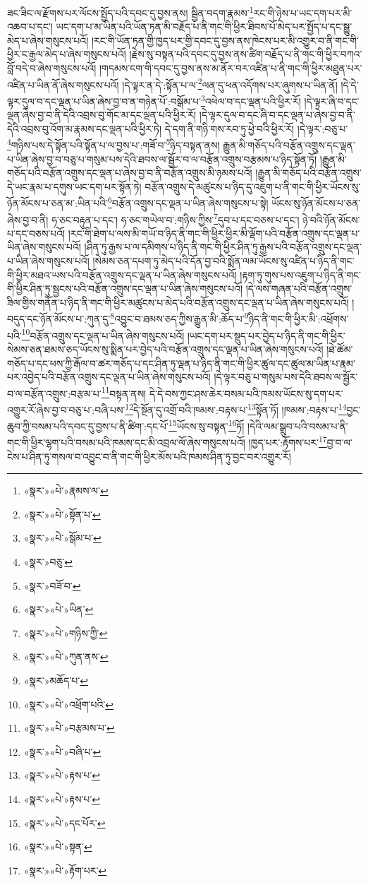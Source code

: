ཟང་ཟིང་ལ་རྫོགས་པར་ལོངས་སྤྱོད་པའི་དབང་དུ་བྱས་ནས། སྦྱིན་བདག་རྣམས་\footnote{«སྣར་»«པེ་»རྣམས་ལ་}རང་གི་ཉེས་པ་ཡང་དག་པར་མི་འཆབ་པ་དང་། ཡང་དག་པ་མ་ཡིན་པའི་ཡོན་ཏན་མི་བརྗོད་པ་ནི་གང་གི་ཕྱིར་ཐིབས་པོ་མེད་པར་སྤྱོད་པ་དང་སྒྱུ་མེད་པ་ཞེས་གསུངས་པའོ། །རང་གི་ཡོན་ཏན་གྱི་ཁྱད་པར་གྱི་དབང་དུ་བྱས་ནས་ཁེངས་པར་མི་འགྱུར་བ་ནི་གང་གི་ཕྱིར་ང་རྒྱལ་མེད་པ་ཞེས་གསུངས་པའོ། །རྗེས་སུ་བསྟན་པའི་དབང་དུ་བྱས་ནས་ཚིག་བརྗོད་པ་ནི་གང་གི་ཕྱིར་བཀའ་བློ་བདེ་བ་ཞེས་གསུངས་པའོ། །གདམས་ངག་གི་དབང་དུ་བྱས་ནས་མ་ནོར་བར་འཛིན་པ་ནི་གང་གི་ཕྱིར་མཐུན་པར་འཛིན་པ་ཡིན་ནོ་ཞེས་གསུངས་པའོ། །དེ་ལྟར་ན་དེ་:སྟོན་པ་ལ་\footnote{«སྣར་»«པེ་»སྟོན་པ་}ལན་དུ་ཕན་འདོགས་པར་ཞུགས་པ་ཡིན་ནོ། །དེ་དེ་ལྟར་དུལ་བ་དང་ལྡན་པ་ཡིན་ཞེས་བྱ་བ་ན་གཉེན་པོ་:བསྒོམ་པ་\footnote{«སྣར་»«པེ་»སྒོམ་པ་}འཕེལ་བ་དང་ལྡན་པའི་ཕྱིར་རོ། །དེ་ལྟར་ཞི་བ་དང་ལྡན་ཞེས་བྱ་བ་ནི་དེའི་འབྲས་བུ་གོང་མ་དང་ལྡན་པའི་ཕྱིར་རོ། །དེ་ལྟར་དུལ་བ་དང་ཞི་བ་དང་ལྡན་པ་ཞེས་བྱ་བ་ནི་དེའི་འབྲས་བུ་འོག་མ་རྣམས་དང་ལྡན་པའི་ཕྱིར་ཏེ། དེ་དག་ནི་གཉི་གས་རབ་ཏུ་ཕྱེ་བའི་ཕྱིར་རོ། །དེ་ལྟར་:བཅུ་པ་\footnote{«སྣར་»བཅུ་}གཉིས་པས་དེ་སྟོན་པའི་སྟོན་པ་ལ་བྱས་པ་:གཟོ་བ་\footnote{«སྣར་»བཟོ་བ་}ཉིད་བསྟན་ནས། རྒྱུན་མི་གཅོད་པའི་བརྩོན་འགྲུས་དང་ལྡན་པ་ཡིན་ཞེས་བྱ་བ་བཅུ་པ་གསུམ་པས་དེའི་ཐབས་ལ་སྦྱོར་བ་ལ་བརྩོན་འགྲུས་བརྩམས་པ་ཉིད་སྟོན་ཏོ། །རྒྱུན་མི་གཅོད་པའི་བརྩོན་འགྲུས་དང་ལྡན་པ་ཞེས་བྱ་བ་ནི་བརྩོན་འགྲུས་མི་ཉམས་པའོ། །རྒྱུན་མི་གཅོད་པའི་བརྩོན་འགྲུས་དེ་ཡང་རྣམ་པ་དགུས་ཡང་དག་པར་སྟོན་ཏེ། བརྩོན་འགྲུས་དེ་མཚུངས་པ་ཉིད་དུ་འཇུག་པ་ནི་གང་གི་ཕྱིར་ཡོངས་སུ་ཉོན་མོངས་པ་ཅན་མ་:ཡིན་པའི་\footnote{«སྣར་»«པེ་»ཡིན་}བརྩོན་འགྲུས་དང་ལྡན་པ་ཡིན་ཞེས་གསུངས་པ་སྟེ། ཡོངས་སུ་ཉོན་མོངས་པ་ཅན་ཞེས་བྱ་བ་ནི། ཧ་ཅང་བརྟུན་པ་དང་། ཧ་ཅང་གཡེལ་བ་:གཉིས་ཀྱིས་\footnote{«སྣར་»«པེ་»གཉིས་ཀྱི་}དུབ་པ་དང་བཅས་པ་དང་། ཉེ་བའི་ཉོན་མོངས་པ་དང་བཅས་པའོ། །རང་གི་ཐེག་པ་ལས་མི་གཡོ་བ་ཉིད་ནི་གང་གི་ཕྱིར་ཕྱིར་མི་ལྡོག་པའི་བརྩོན་འགྲུས་དང་ལྡན་པ་ཡིན་ཞེས་གསུངས་པའོ། །ཤིན་ཏུ་རྒྱས་པ་ལ་དམིགས་པ་ཉིད་ནི་གང་གི་ཕྱིར་ཤིན་ཏུ་རྒྱས་པའི་བརྩོན་འགྲུས་དང་ལྡན་པ་ཡིན་ཞེས་གསུངས་པའོ། །སེམས་ཅན་དཔག་ཏུ་མེད་པའི་དོན་བྱ་བའི་སྨོན་ལམ་ཡོངས་སུ་འཛིན་པ་ཉིད་ནི་གང་གི་ཕྱིར་མཐའ་ཡས་པའི་བརྩོན་འགྲུས་དང་ལྡན་པ་ཡིན་ཞེས་གསུངས་པའོ། །རྟག་ཏུ་གུས་པས་འཇུག་པ་ཉིད་ནི་གང་གི་ཕྱིར་ཤིན་ཏུ་སྦྱངས་པའི་བརྩོན་འགྲུས་དང་ལྡན་པ་ཡིན་ཞེས་གསུངས་པའོ། །དེ་ལས་གཞན་པའི་བརྩོན་འགྲུས་ཟིལ་གྱིས་གནོན་པ་ཉིད་ནི་གང་གི་ཕྱིར་མཚུངས་པ་མེད་པའི་བརྩོན་འགྲུས་དང་ལྡན་པ་ཡིན་ཞེས་གསུངས་པའོ། །བདུད་དང་ཉོན་མོངས་པ་:ཀུན་དུ་\footnote{«སྣར་»«པེ་»ཀུན་ནས་}འབྱུང་བ་ཐམས་ཅད་ཀྱིས་རྒྱུན་མི་:ཆོད་པ་\footnote{«སྣར་»མཆོད་པ་}ཉིད་ནི་གང་གི་ཕྱིར་མི་:འཕྲོགས་པའི་\footnote{«སྣར་»«པེ་»འཕྲོག་པའི་}བརྩོན་འགྲུས་དང་ལྡན་པ་ཡིན་ཞེས་གསུངས་པའོ། །ཡང་དག་པར་སྡུད་པར་བྱེད་པ་ཉིད་ནི་གང་གི་ཕྱིར་སེམས་ཅན་ཐམས་ཅད་ཡོངས་སུ་སྨིན་པར་བྱེད་པའི་བརྩོན་འགྲུས་དང་ལྡན་པ་ཡིན་ཞེས་གསུངས་པའོ། །ཐེ་ཚོམ་གཅོད་པ་དང་ཕས་ཀྱི་རྒོལ་བ་ཚར་གཅོད་པ་དང་ཤིན་ཏུ་ལྡན་པ་ཉིད་ནི་གང་གི་ཕྱིར་ཚུལ་དང་ཚུལ་མ་ཡིན་པ་རྣམ་པར་འབྱེད་པའི་བརྩོན་འགྲུས་དང་ལྡན་པ་ཡིན་ཞེས་གསུངས་པའོ། །དེ་ལྟར་བཅུ་པ་གསུམ་པས་དེའི་ཐབས་ལ་སྦྱོར་བ་ལ་བརྩོན་འགྲུས་:བརྩམ་པ་\footnote{«སྣར་»«པེ་»བརྩམས་པ་}བསྟན་ནས། དེ་དེ་བས་ཀྱང་ཤས་ཆེར་བསམ་པའི་ཁམས་ཡོངས་སུ་དག་པར་འགྱུར་རོ་ཞེས་བྱ་བ་བཅུ་པ་:བཞི་པས་\footnote{«སྣར་»«པེ་»བཞི་པ་}དེ་སྔོན་དུ་འགྲོ་བའི་ཁམས་:བརྟས་པ་\footnote{«སྣར་»«པེ་»རྟས་པ་}སྟོན་ཏོ། །ཁམས་:བརྟས་པ་\footnote{«སྣར་»«པེ་»རྟས་པ་}བྱང་ཆུབ་ཀྱི་བསམ་པའི་དབང་དུ་བྱས་པ་ནི་ཚིག་:དང་པོ་\footnote{«སྣར་»«པེ་»དང་པོར་}ཡོངས་སུ་བསྟན་\footnote{«སྣར་»«པེ་»སྟན་}ཏོ། །དེའི་ལམ་སྒྲུབ་པའི་བསམ་པ་ནི་གང་གི་ཕྱིར་ལྷག་པའི་བསམ་པའི་ཁམས་དང་མི་འབྲལ་ལོ་ཞེས་གསུངས་པའོ། །ཁྱད་པར་:རྟོགས་པར་\footnote{«སྣར་»«པེ་»རྟོག་པར་}བྱ་བ་ལ་ངེས་པ་ཤིན་ཏུ་གསལ་བ་འབྱུང་བ་ནི་གང་གི་ཕྱིར་མོས་པའི་ཁམས་ཤིན་ཏུ་བྱང་བར་འགྱུར་རོ། 